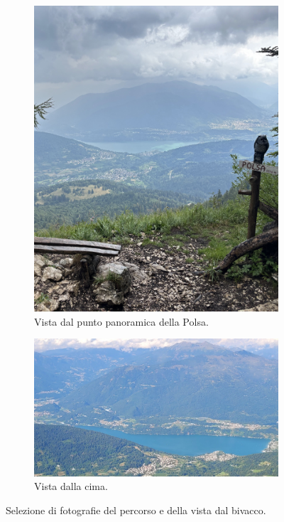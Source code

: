 \documentclass{article}
\begin{document}
\begin{figure}[htbp!]
\begin{subfigure}[b]{0.45\textwidth}
        \includegraphics[width=\textwidth]{images/foto_polsa.jpg}
        \caption{Vista dal punto panoramica della Polsa.}
    \end{subfigure}
    \hfill
    
    \vspace{1em}
    
    \begin{subfigure}[b]{\textwidth}
        \includegraphics[width=\textwidth]{images/foto_bivacco.jpg}
        \caption{Vista dalla cima.}
    \end{subfigure}
    \caption{Selezione di fotografie del percorso e della vista dal bivacco.}
\end{figure}
\end{document}
